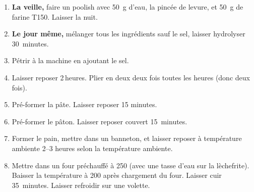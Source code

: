 
\begin{ingredients}
\end{ingredients}


\begin{recipe}
  \begin{enumerate}
    
  \item \textbf{La veille,} faire un poolish avec 50~g d'eau, la
    pincée de levure, et 50~g de farine T150.  Laisser la nuit.

  \item \textbf{Le jour même,} mélanger tous les ingrédients sauf le
    sel, laisser hydrolyser 30~minutes.
    
  \item Pétrir à la machine en ajoutant le sel.
    
  \item Laisser reposer 2$\,$\fracH heures.  Plier en deux deux fois toutes
    les heures (donc deux fois).
    
  \item Pré-former la pâte.  Laisser reposer 15 minutes.
    
  \item Pré-former le pâton.  Laisser reposer couvert 15~minutes.
    
  \item Former le pain, mettre dans un banneton, et laisser reposer à
    température ambiente 2--3 heures selon la température ambiente.
    
  \item Mettre dans un four préchauffé à 250\degreeC{} (avec une tasse
    d'eau sur la lèchefrite).  Baisser la température à 200\degreeC{}
    après chargement du four.  Laisser cuir 35~minutes.  Laisser
    refroidir sur une volette.

  \end{enumerate}
\end{recipe}

